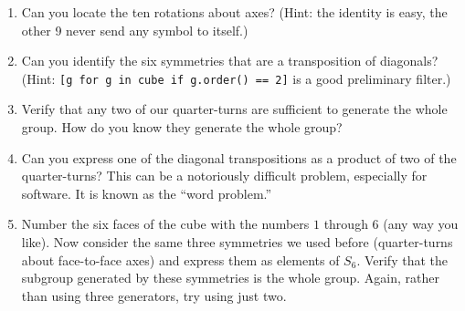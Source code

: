 \begin{enumerate}
%
\item  Can you locate the ten rotations about axes?  (Hint: the identity is easy, the other 9 never send any symbol to itself.)
%
\item Can you identify the six symmetries that are a transposition of diagonals?  (Hint: \verb?[g for g in cube if g.order() == 2]? is a good preliminary filter.)
%
\item Verify that any two of our quarter-turns are sufficient to generate the whole group.  How do you know they generate the whole group?
%
\item Can you express one of the diagonal transpositions as a product of two of the quarter-turns?  This can be a notoriously difficult problem, especially for software.  It is known as the ``word problem.''
%
\item Number the six faces of the cube with the numbers $1$ through $6$ (any way you like).  Now consider the same three symmetries we used before (quarter-turns about face-to-face axes) and express them as elements of $S_6$.  Verify that the subgroup generated by these symmetries is the whole group.  Again, rather than using three generators, try using just two.
%
\end{enumerate}
%
\begin{sageverbatim}
\end{sageverbatim}
%

